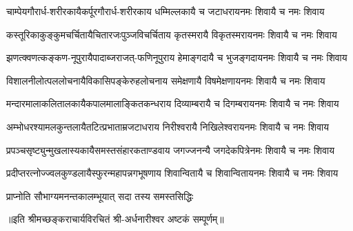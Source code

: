 

\fourlineindentedshloka
{चाम्पेयगौरार्ध-शरीरकायै}{कर्पूरगौरार्ध-शरीरकाय}
{धम्मिल्लकायै च जटाधराय}{नमः शिवायै च नमः शिवाय}

\fourlineindentedshloka
{कस्तूरिकाकुङ्कुमचर्चितायै}{चितारजःपुञ्जविचर्चिताय}
{कृतस्मरायै विकृतस्मराय}{नमः शिवायै च नमः शिवाय}

\fourlineindentedshloka
{झणत्क्वणत्कङ्कण-नूपुरायै}{पादाब्जराजत्-फणिनूपुराय}
{हेमाङ्गदायै च भुजङ्गदाय}{नमः शिवायै च नमः शिवाय}

\fourlineindentedshloka
{विशालनीलोत्पललोचनायै}{विकासिपङ्केरुहलोचनाय}
{समेक्षणायै विषमेक्षणाय}{नमः शिवायै च नमः शिवाय}

\fourlineindentedshloka
{मन्दारमालाकलितालकायै}{कपालमालाङ्कितकन्धराय}
{दिव्याम्बरायै च दिगम्बराय}{नमः शिवायै च नमः शिवाय}

\fourlineindentedshloka
{अम्भोधरश्यामलकुन्तलायै}{तटित्प्रभाताम्रजटाधराय}
{निरीश्वरायै निखिलेश्वराय}{नमः शिवायै च नमः शिवाय}

\fourlineindentedshloka
{प्रपञ्चसृष्ट्युन्मुखलास्यकायै}{समस्तसंहारकताण्डवाय}
{जगज्जनन्यै जगदेकपित्रे}{नमः शिवायै च नमः शिवाय}

\fourlineindentedshloka
{प्रदीप्तरत्नोज्ज्वलकुण्डलायै}{स्फुरन्महापन्नगभूषणाय}
{शिवान्वितायै च शिवान्विताय}{नमः शिवायै च नमः शिवाय}

{प्राप्नोति सौभाग्यमनन्तकालम्}{भूयात् सदा तस्य समस्तसिद्धिः}

{॥इति श्रीमच्छङ्कराचार्यविरचितं श्री-अर्धनारीश्वर अष्टकं सम्पूर्णम्॥}
%
%
%
